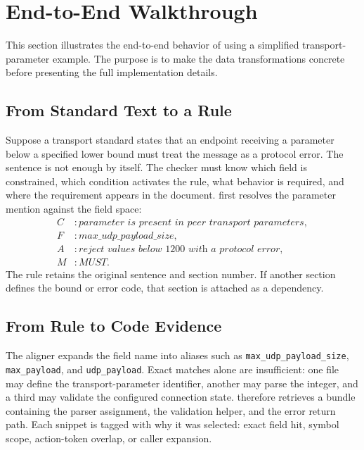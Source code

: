 \section{End-to-End Walkthrough}
\label{sec:walkthrough}

This section illustrates the end-to-end behavior of \tool{} using a simplified
transport-parameter example. The purpose is to make the data transformations
concrete before presenting the full implementation details.

\subsection{From Standard Text to a Rule}

Suppose a transport standard states that an endpoint receiving a parameter
below a specified lower bound must treat the message as a protocol error. The
sentence is not enough by itself. The checker must know which field is
constrained, which condition activates the rule, what behavior is required, and
where the requirement appears in the document. \tool{} first resolves the
parameter mention against the field space:
\[
\begin{aligned}
C &: \textit{parameter is present in peer transport parameters},\\
F &: \textit{max\_udp\_payload\_size},\\
A &: \textit{reject values below 1200 with a protocol error},\\
M &: \textit{MUST}.
\end{aligned}
\]
The rule retains the original sentence and section number. If another section
defines the bound or error code, that section is attached as a dependency.

\subsection{From Rule to Code Evidence}

The aligner expands the field name into aliases such as
\texttt{max\_udp\_payload\_size}, \texttt{max\_payload}, and
\texttt{udp\_payload}. Exact matches alone are insufficient: one file may define
the transport-parameter identifier, another may parse the integer, and a third
may validate the configured connection state. \tool{} therefore retrieves a
bundle containing the parser assignment, the validation helper, and the error
return path. Each snippet is tagged with why it was selected: exact field hit,
symbol scope, action-token overlap, or caller expansion.

